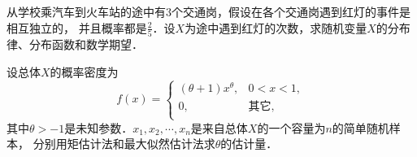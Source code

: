 \documentclass[plain,noanswer,medmath]{../../template/jnuexam}
\begin{document}

\begin{problem}
从学校乘汽车到火车站的途中有$3$个交通岗，假设在各个交通岗遇到红灯的事件是相互独立的，
并且概率都是$\frac{2}{5}$．设$X$为途中遇到红灯的次数，求随机变量$X$的分布律、分布函数和数学期望．
\end{problem}



\begin{problem}
设总体$X$的概率密度为
$$f(x) = \begin{cases}
 (\theta + 1)x^{\theta}, & 0 < x < 1, \\
 0, & \text{其它}, \\
\end{cases}$$
其中$\theta > - 1$是未知参数．$x_1,x_2, \cdots ,x_n$是来自总体$X$的一个容量为$n$的简单随机样本，
分别用矩估计法和最大似然估计法求$\theta$的估计量．
\end{problem}
\end{document}
